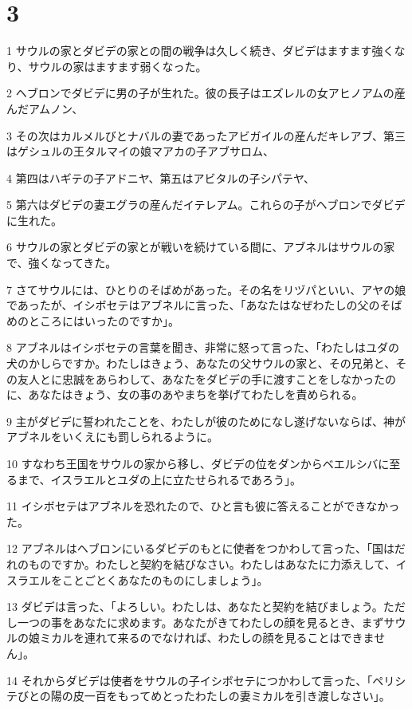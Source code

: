 \chapter{3}

\par 1 サウルの家とダビデの家との間の戦争は久しく続き、ダビデはますます強くなり、サウルの家はますます弱くなった。
\par 2 ヘブロンでダビデに男の子が生れた。彼の長子はエズレルの女アヒノアムの産んだアムノン、
\par 3 その次はカルメルびとナバルの妻であったアビガイルの産んだキレアブ、第三はゲシュルの王タルマイの娘マアカの子アブサロム、
\par 4 第四はハギテの子アドニヤ、第五はアビタルの子シパテヤ、
\par 5 第六はダビデの妻エグラの産んだイテレアム。これらの子がヘブロンでダビデに生れた。
\par 6 サウルの家とダビデの家とが戦いを続けている間に、アブネルはサウルの家で、強くなってきた。
\par 7 さてサウルには、ひとりのそばめがあった。その名をリヅパといい、アヤの娘であったが、イシボセテはアブネルに言った、「あなたはなぜわたしの父のそばめのところにはいったのですか」。
\par 8 アブネルはイシボセテの言葉を聞き、非常に怒って言った、「わたしはユダの犬のかしらですか。わたしはきょう、あなたの父サウルの家と、その兄弟と、その友人とに忠誠をあらわして、あなたをダビデの手に渡すことをしなかったのに、あなたはきょう、女の事のあやまちを挙げてわたしを責められる。
\par 9 主がダビデに誓われたことを、わたしが彼のためになし遂げないならば、神がアブネルをいくえにも罰しられるように。
\par 10 すなわち王国をサウルの家から移し、ダビデの位をダンからベエルシバに至るまで、イスラエルとユダの上に立たせられるであろう」。
\par 11 イシボセテはアブネルを恐れたので、ひと言も彼に答えることができなかった。
\par 12 アブネルはヘブロンにいるダビデのもとに使者をつかわして言った、「国はだれのものですか。わたしと契約を結びなさい。わたしはあなたに力添えして、イスラエルをことごとくあなたのものにしましょう」。
\par 13 ダビデは言った、「よろしい。わたしは、あなたと契約を結びましょう。ただし一つの事をあなたに求めます。あなたがきてわたしの顔を見るとき、まずサウルの娘ミカルを連れて来るのでなければ、わたしの顔を見ることはできません」。
\par 14 それからダビデは使者をサウルの子イシボセテにつかわして言った、「ペリシテびとの陽の皮一百をもってめとったわたしの妻ミカルを引き渡しなさい」。
